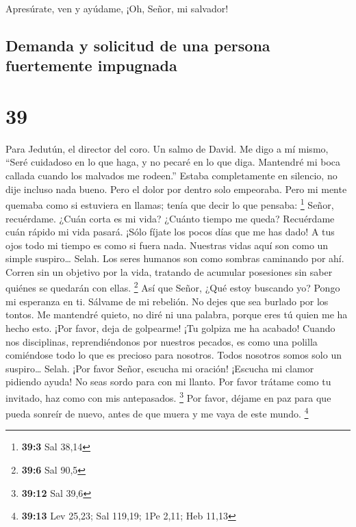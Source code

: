  Apresúrate, ven y ayúdame, ¡Oh, Señor, mi salvador!

\hypertarget{demanda-y-solicitud-de-una-persona-fuertemente-impugnada}{%
\subsection{Demanda y solicitud de una persona fuertemente
impugnada}\label{demanda-y-solicitud-de-una-persona-fuertemente-impugnada}}

\hypertarget{section-38}{%
\section{39}\label{section-38}}

Para Jedutún, el director del coro. Un salmo de David.  Me
digo a mí mismo, ``Seré cuidadoso en lo que haga, y no pecaré en lo que
diga. Mantendré mi boca callada cuando los malvados me rodeen.''
 Estaba completamente en silencio, no dije incluso nada
bueno. Pero el dolor por dentro solo empeoraba.  Pero mi
mente quemaba como si estuviera en llamas; tenía que decir lo que
pensaba: \footnote{\textbf{39:3} Sal 38,14}  Señor,
recuérdame. ¿Cuán corta es mi vida? ¿Cuánto tiempo me queda? Recuérdame
cuán rápido mi vida pasará.  ¡Sólo fíjate los pocos días que
me has dado! A tus ojos todo mi tiempo es como si fuera nada. Nuestras
vidas aquí son como un simple suspiro\ldots{} Selah.  Los
seres humanos son como sombras caminando por ahí. Corren sin un objetivo
por la vida, tratando de acumular posesiones sin saber quiénes se
quedarán con ellas. \footnote{\textbf{39:6} Sal 90,5}  Así
que Señor, ¿Qué estoy buscando yo? Pongo mi esperanza en ti.
 Sálvame de mi rebelión. No dejes que sea burlado por los
tontos.  Me mantendré quieto, no diré ni una palabra, porque
eres tú quien me ha hecho esto.  ¡Por favor, deja de
golpearme! ¡Tu golpiza me ha acabado!  Cuando nos
disciplinas, reprendiéndonos por nuestros pecados, es como una polilla
comiéndose todo lo que es precioso para nosotros. Todos nosotros somos
solo un suspiro\ldots{} Selah.  ¡Por favor Señor, escucha
mi oración! ¡Escucha mi clamor pidiendo ayuda! No seas sordo para con mi
llanto. Por favor trátame como tu invitado, haz como con mis
antepasados. \footnote{\textbf{39:12} Sal 39,6}  Por favor,
déjame en paz para que pueda sonreír de nuevo, antes de que muera y me
vaya de este mundo. \footnote{\textbf{39:13} Lev 25,23; Sal 119,19; 1Pe
  2,11; Heb 11,13}

